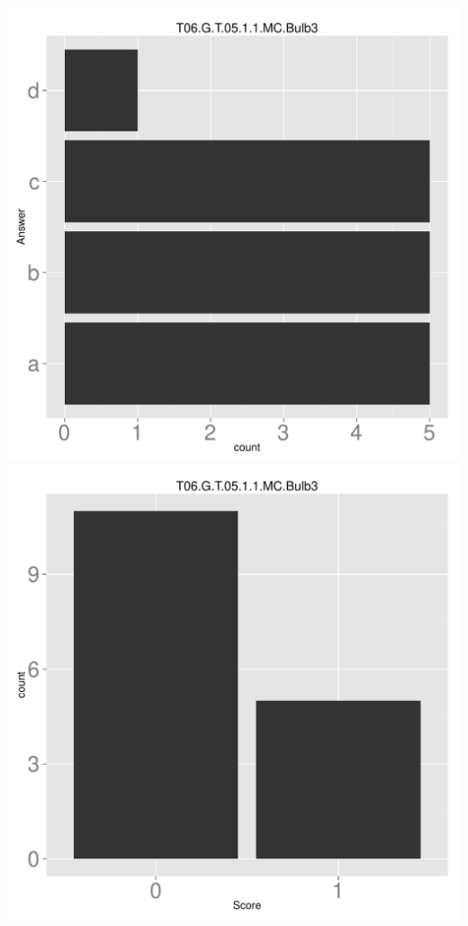 \documentclass[12pt,nohyper]{tufte-handout}\usepackage[]{graphicx}\usepackage[]{color}
\begin{document}
\begin{center} \includegraphics[width=.45\linewidth]{Topic06_81_answer} \includegraphics[width=.45\linewidth]{Topic06_81_score} \end{center} 
\end{document}
